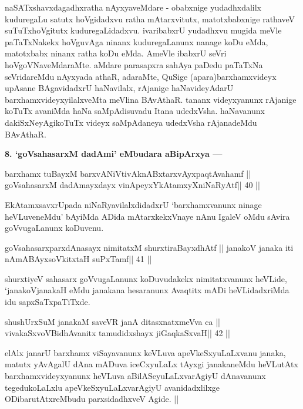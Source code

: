 \begin{artha}
naSATxshavxdagadhxratha nAyxyaveMdare - obabxnige yudadhxdalilx 
kuduregaLu satutx hoVgidadxvu ratha mAtarxvitutx, matotxbabxnige 
rathaveV suTuTxhoVgitutx kuduregaLidadxvu. ivaribabxrU yudadhxvu mugida 
meVle paTaTxNakekx hoVguvAga ninanx kuduregaLanunx nanage koDu eMda, 
matotxbabx ninanx ratha koDu eMda. AmeVle ibabxrU seVri hoVgoVNaveMdaraMte. aMdare parasapxra sahAya paDedu paTaTxNa seVridareMdu nAyxyada athaR, adaraMte, QuSige (apara)barxhamxvideyx upAsane BAgavidadxrU haNavilalx, rAjanige haNavideyAdarU barxhamxvideyxyilalxveMta meVlina BAvAthaR. tananx videyxyanunx rAjanige koTuTx avaniMda haNa saMpAdisuvadu Itana udedxVsha. haNavanunx dakiSxNeyAgikoTuTx videyx saMpAdaneya udedxVsha rAjanadeMdu BAvAthaR.
\end{artha}

\begin{artha}
{\bf 8. `goVsahasarxM dadAmi' eMbudara aBipArxya ---}
\end{artha} 

\begin{shl}
barxhamx tuBayxM barxvANiVtivAknABxtarxvAyxpaqtAvahamf ||
goVsahasarxM dadAmayxdayx vinA\s peyxYkAtamxyXniNaRyAtf\hfill || 40 ||
\end{shl}

\begin{artha}
EkAtamxsavxrUpada niNaRyavilalxdidadxrU `barxhamxvanunx ninage 
heVLuveneMdu' bAyiMda ADida mAtarxkekxVnaye nAnu IgaleV oMdu sAvira goVvugaLanunx koDuvenu.
\end{artha}

\begin{shl}
goVsahasarxparxdAnasayx nimitatxM shurxtiraBayxdhAtf ||
janakoV janaka iti nAmABAyxsoVkitxtaH suPxTamf\hfill || 41 ||
\end{shl}

\begin{artha}
shurxtiyeV sahasarx goVvugaLanunx koDuvudakekx nimitatxvanunx heVLide, `janakoVjanakaH eMdu janakana hesaranunx Avaqtitx mADi heVLidadxriMda idu sapxSaTxpaTiTxde.
\end{artha}

\begin{shl}
shushUrxSuM janakaM saveVR janA ditasxnatxmeVva ca ||
vivakaSxvoV\s BidhAvanitx tamudidxshayx jiGaqkaSxvaH\hfill || 42 ||
\end{shl}

\begin{artha}
elAlx janarU barxhamx viSayavanunx keVLuva apeVkeSxyuLaLxvanu janaka, matutx yAvAgalU dAna mADuva iceCxyuLaLx tAyxgi janakaneMdu heVLutAtx barxhamxvideyxyanunx heVLuva aBilASeyuLaLxvarAgiyU dAnavanunx tegedukoLaLxlu apeVkeSxyuLaLxvarAgiyU avanidadxlilxge ODibarutAtxreMbudu parxsidadhxveV Agide. ||
\end{artha}


